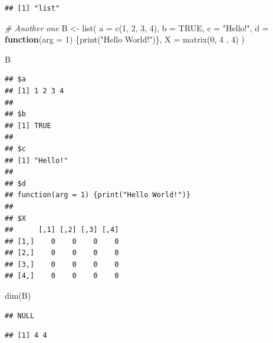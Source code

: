 \documentclass[
]{book}
\newenvironment{Shaded}{\begin{snugshade}}{\end{snugshade}}
\newcommand{\AttributeTok}[1]{\textcolor[rgb]{0.77,0.63,0.00}{#1}}
\newcommand{\CommentTok}[1]{\textcolor[rgb]{0.56,0.35,0.01}{\textit{#1}}}
\newcommand{\ConstantTok}[1]{\textcolor[rgb]{0.00,0.00,0.00}{#1}}
\newcommand{\ControlFlowTok}[1]{\textcolor[rgb]{0.13,0.29,0.53}{\textbf{#1}}}
\newcommand{\DecValTok}[1]{\textcolor[rgb]{0.00,0.00,0.81}{#1}}
\newcommand{\FunctionTok}[1]{\textcolor[rgb]{0.00,0.00,0.00}{#1}}
\newcommand{\NormalTok}[1]{#1}
\newcommand{\OtherTok}[1]{\textcolor[rgb]{0.56,0.35,0.01}{#1}}
\newcommand{\SpecialCharTok}[1]{\textcolor[rgb]{0.00,0.00,0.00}{#1}}
\newcommand{\StringTok}[1]{\textcolor[rgb]{0.31,0.60,0.02}{#1}}
\begin{document}
\begin{verbatim}
## [1] "list"
\end{verbatim}

\begin{Shaded}
\begin{Highlighting}[]
\CommentTok{\# Another one}
\NormalTok{B }\OtherTok{\textless{}{-}} \FunctionTok{list}\NormalTok{(}
          \AttributeTok{a =} \FunctionTok{c}\NormalTok{(}\DecValTok{1}\NormalTok{, }\DecValTok{2}\NormalTok{, }\DecValTok{3}\NormalTok{, }\DecValTok{4}\NormalTok{),}
          \AttributeTok{b =} \ConstantTok{TRUE}\NormalTok{,}
          \AttributeTok{c =} \StringTok{"Hello!"}\NormalTok{,}
          \AttributeTok{d =} \ControlFlowTok{function}\NormalTok{(}\AttributeTok{arg =} \DecValTok{1}\NormalTok{) \{}\FunctionTok{print}\NormalTok{(}\StringTok{"Hello World!"}\NormalTok{)\},}
          \AttributeTok{X =} \FunctionTok{matrix}\NormalTok{(}\DecValTok{0}\NormalTok{, }\DecValTok{4}\NormalTok{ , }\DecValTok{4}\NormalTok{)}
\NormalTok{)}

\NormalTok{B}
\end{Highlighting}
\end{Shaded}

\begin{verbatim}
## $a
## [1] 1 2 3 4
## 
## $b
## [1] TRUE
## 
## $c
## [1] "Hello!"
## 
## $d
## function(arg = 1) {print("Hello World!")}
## 
## $X
##      [,1] [,2] [,3] [,4]
## [1,]    0    0    0    0
## [2,]    0    0    0    0
## [3,]    0    0    0    0
## [4,]    0    0    0    0
\end{verbatim}

\begin{Shaded}
\begin{Highlighting}[]
\FunctionTok{dim}\NormalTok{(B)}
\end{Highlighting}
\end{Shaded}

\begin{verbatim}
## NULL
\end{verbatim}

\begin{Shaded}
\end{Shaded}

\begin{verbatim}
## [1] 4 4
\end{verbatim}
\end{document}
